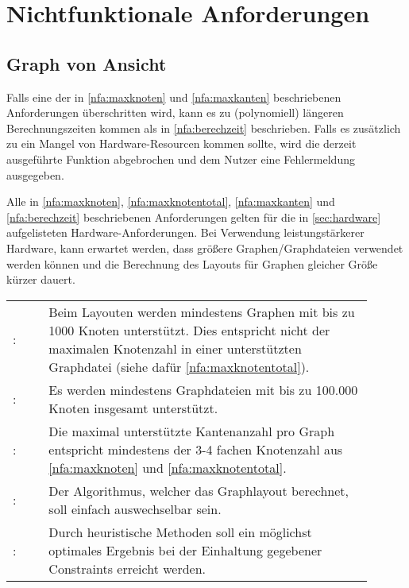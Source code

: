 \chapter{Nichtfunktionale Anforderungen}
\label{ch:nfa}

\setcounter{nfanr}{10}
\newcommand{\nfano}{\ifnum\value{nfanr}<10 00\else\ifnum\value{nfanr}<100 0\fi\fi\arabic{nfanr}}
\newcommand\nfa[2]{\namedlabel{nfa:#1}{/NFA\nfano/}\addtocounter{nfanr}{10}: & #2 \\ [1ex] }

\section{Graph von Ansicht}

Falls eine der in \ref{nfa:maxknoten}  und \ref{nfa:maxkanten} beschriebenen Anforderungen überschritten wird, kann es zu (polynomiell) längeren Berechnungszeiten kommen als in \ref{nfa:berechzeit} beschrieben. Falls es zusätzlich zu ein Mangel von Hardware-Resourcen kommen sollte, wird die derzeit ausgeführte Funktion abgebrochen und dem Nutzer eine Fehlermeldung ausgegeben.

Alle in \ref{nfa:maxknoten}, \ref{nfa:maxknotentotal}, \ref{nfa:maxkanten} und \ref{nfa:berechzeit} beschriebenen Anforderungen gelten für die in \autoref{sec:hardware} aufgelisteten Hardware-Anforderungen. Bei Verwendung leistungstärkerer Hardware, kann erwartet werden, dass größere Graphen/Graphdateien verwendet werden können und die Berechnung des Layouts für Graphen gleicher Größe kürzer dauert.\\


\begin{tabular}{lp{0.9\linewidth}}
  \nfa{maxknoten}{Beim Layouten werden mindestens Graphen mit bis zu 1000 Knoten unterstützt. Dies entspricht nicht der maximalen Knotenzahl in einer unterstützten Graphdatei (siehe dafür \ref{nfa:maxknotentotal}).}
  \nfa{maxknotentotal}{Es werden mindestens Graphdateien mit bis zu 100.000 Knoten insgesamt unterstützt.}
  \nfa{maxkanten}{Die maximal unterstützte Kantenanzahl pro Graph entspricht mindestens der 3-4 fachen Knotenzahl aus \ref{nfa:maxknoten} und \ref{nfa:maxknotentotal}.}

  \nfa{algowechsel}{Der Algorithmus, welcher das Graphlayout berechnet, soll einfach auswechselbar sein.}
  \nfa{heuristic}{Durch heuristische Methoden soll ein möglichst optimales Ergebnis bei der Einhaltung gegebener Constraints erreicht werden.}
\end{tabular}

